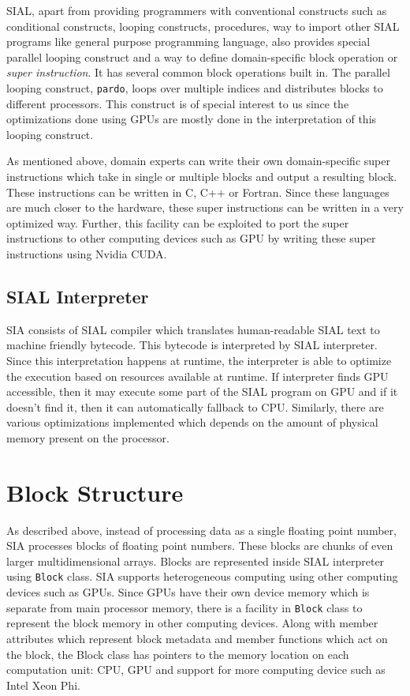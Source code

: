 SIAL, apart from providing programmers with conventional constructs such as
conditional constructs, looping constructs, procedures, way to import other SIAL
programs like general purpose programming language, also provides special parallel looping construct and a way
to define domain-specific block operation or \textit{super instruction}. It
has several common block operations built in. The
parallel looping construct, \texttt{pardo}, loops over multiple indices and
distributes blocks to different processors. This construct is of special
interest to us since the optimizations done using GPUs are mostly done in the
interpretation of this looping construct.

As mentioned above, domain experts can write their own domain-specific
super instructions which take in single or multiple blocks and output a resulting block. These
instructions can be written in C, C++ or Fortran. Since these languages are much
closer to the hardware, these super instructions can be written in a very
optimized way. Further, this facility can be exploited to port the super instructions to
other computing devices such as GPU by writing these super instructions using
Nvidia CUDA.

\subsection{SIAL Interpreter}
SIA consists of SIAL compiler which translates human-readable SIAL text to
machine friendly bytecode. This bytecode is interpreted by SIAL interpreter.
Since this interpretation happens at runtime, the interpreter is able to optimize the
execution based on resources available at runtime. If interpreter finds GPU
accessible, then it may execute some part of the SIAL program on GPU and if it
doesn't find it, then it can automatically fallback to CPU. Similarly, there are
various optimizations implemented which depends on the amount of physical memory
present on the processor.

\section{Block Structure}
As described above, instead of processing data as a single floating point
number, SIA processes blocks of floating point numbers. These blocks are chunks
of even larger multidimensional arrays. Blocks are represented inside SIAL
interpreter using \texttt{Block} class. SIA supports heterogeneous computing
using other computing devices such as GPUs. Since GPUs have their own device memory
which is separate from main processor memory, there is a facility in
\texttt{Block} class to represent the block memory in other
computing devices. Along with member attributes which represent block metadata
and member functions which act on the block, the Block class has pointers to
the memory location on each computation unit: CPU, GPU and support for more
computing device such as Intel Xeon Phi.

